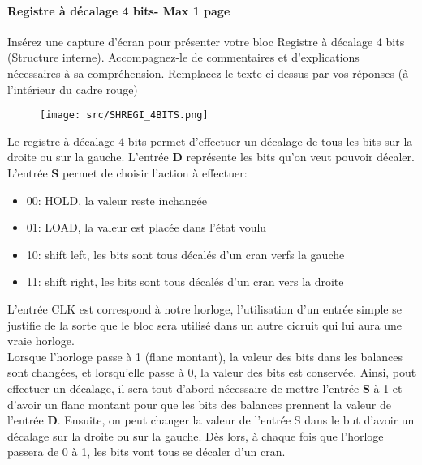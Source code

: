 \documentclass[a4paper]{article} %
\begin{document}
\begin{tcolorbox}[colframe=Monokaimagenta,colback=white]
\paragraph{Registre à décalage 4 bits- Max 1 page } %
Insérez une capture d’écran pour présenter votre bloc Registre à décalage 4 bits (Structure interne).
Accompagnez-le de commentaires et d’explications nécessaires à sa compréhension.
Remplacez le texte ci-dessus par vos réponses (à l’intérieur du cadre rouge)\\ 

\begin{figure}[H]
    \centering
    \texttt{[image: src/SHREGI\_4BITS.png]}
    \label{fig:SHREGI_4}
\end{figure}

Le registre à décalage 4 bits permet d'effectuer un décalage de tous les bits sur la droite ou sur la gauche. L'entrée \textbf{D} représente les bits qu'on veut pouvoir décaler.
L'entrée \textbf{S} permet de choisir l'action à effectuer: 
\begin{itemize}
    \item 00: HOLD, la valeur reste inchangée
    \item 01: LOAD, la valeur est placée dans l'état voulu
    \item 10: shift left, les bits sont tous décalés d'un cran verfs la gauche
    \item 11: shift right, les bits sont tous décalés d'un cran vers la droite
\end{itemize}
\vspace{1em}
L'entrée CLK est correspond à notre horloge, l'utilisation d'un entrée simple se justifie de la sorte que le bloc sera utilisé dans un autre cicruit qui lui aura une vraie horloge.\\
Lorsque l'horloge passe à 1 (flanc montant), la valeur des bits dans les balances sont changées, et lorsqu'elle passe à 0, la valeur des bits est conservée.
Ainsi, pout effectuer un décalage, il sera tout d'abord nécessaire de mettre l'entrée \textbf{S} à 1 et d'avoir un flanc montant pour que les bits des balances prennent la valeur de l'entrée \textbf{D}. Ensuite, on peut changer la valeur de l'entrée S dans le but d'avoir un décalage sur la droite ou sur la gauche. Dès lors, à chaque fois que l'horloge passera de 0 à 1, les bits vont tous se décaler d'un cran.
    
\end{tcolorbox}
\end{document}

